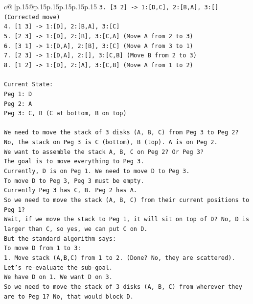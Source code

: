 \documentclass{article}
\begin{document}
{\begin{supertabular}{c@{$\;$}|p{.15\linewidth}@{}p{.15\linewidth}p{.15\linewidth}p{.15\linewidth}p{.15\linewidth}p{.15\linewidth}}
{{{\texttt{3. {[}3 2{]} {-}> 1:{[}D,C{]}, 2:{[}B,A{]}, 3:{[}{]} (Corrected move)} \\
\texttt{4. {[}1 3{]} {-}> 1:{[}D{]}, 2:{[}B,A{]}, 3:{[}C{]}} \\
\texttt{5. {[}2 3{]} {-}> 1:{[}D{]}, 2:{[}B{]}, 3:{[}C,A{]} (Move A from 2 to 3)} \\
\texttt{6. {[}3 1{]} {-}> 1:{[}D,A{]}, 2:{[}B{]}, 3:{[}C{]} (Move A from 3 to 1)} \\
\texttt{7. {[}2 3{]} {-}> 1:{[}D,A{]}, 2:{[}{]}, 3:{[}C,B{]} (Move B from 2 to 3)} \\
\texttt{8. {[}1 2{]} {-}> 1:{[}D{]}, 2:{[}A{]}, 3:{[}C,B{]} (Move A from 1 to 2)} \\
\\ 
\texttt{Current State:} \\
\texttt{Peg 1: D} \\
\texttt{Peg 2: A} \\
\texttt{Peg 3: C, B (C at bottom, B on top)} \\
\\ 
\texttt{We need to move the stack of 3 disks (A, B, C) from Peg 3 to Peg 2?} \\
\texttt{No, the stack on Peg 3 is C (bottom), B (top). A is on Peg 2.} \\
\texttt{We want to assemble the stack A, B, C on Peg 2? Or Peg 3?} \\
\texttt{The goal is to move everything to Peg 3.} \\
\texttt{Currently, D is on Peg 1. We need to move D to Peg 3.} \\
\texttt{To move D to Peg 3, Peg 3 must be empty.} \\
\texttt{Currently Peg 3 has C, B. Peg 2 has A.} \\
\texttt{So we need to move the stack (A, B, C) from their current positions to Peg 1?} \\
\texttt{Wait, if we move the stack to Peg 1, it will sit on top of D? No, D is larger than C, so yes, we can put C on D.} \\
\texttt{But the standard algorithm says:} \\
\texttt{To move D from 1 to 3:} \\
\texttt{1. Move stack (A,B,C) from 1 to 2. (Done? No, they are scattered).} \\
\texttt{Let's re{-}evaluate the sub{-}goal.} \\
\texttt{We have D on 1. We want D on 3.} \\
\texttt{So we need to move the stack of 3 disks (A, B, C) from wherever they are to Peg 1? No, that would block D.} \\
}}}
\end{supertabular}}
\end{document}
